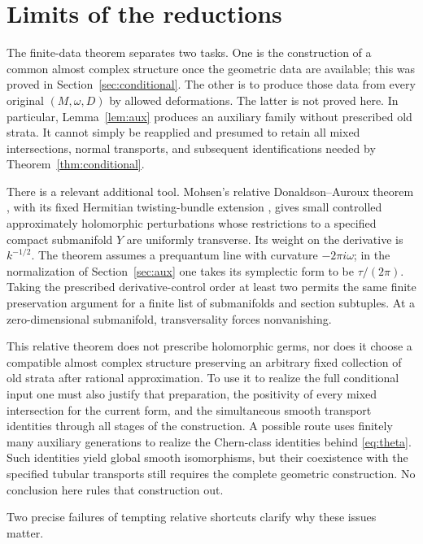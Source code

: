 \documentclass[11pt]{article}
\theoremstyle{definition}
\theoremstyle{remark}
\begin{document}
\section{Limits of the reductions}\label{sec:limits}

The finite-data theorem separates two tasks. One is the construction of a common almost complex structure once the geometric data are available; this was proved in Section~\ref{sec:conditional}. The other is to produce those data from every original $(M,\omega,D)$ by allowed deformations. The latter is not proved here. In particular, Lemma~\ref{lem:aux} produces an auxiliary family without prescribed old strata. It cannot simply be reapplied and presumed to retain all mixed intersections, normal transports, and subsequent identifications needed by Theorem~\ref{thm:conditional}.

There is a relevant additional tool. Mohsen's relative Donaldson--Auroux theorem \cite[p.~657]{Mohsen}, with its fixed Hermitian twisting-bundle extension \cite[p.~662]{Mohsen}, gives small controlled approximately holomorphic perturbations whose restrictions to a specified compact submanifold $Y$ are uniformly transverse. Its weight on the derivative is $k^{-1/2}$. The theorem assumes a prequantum line with curvature $-2\pi i\omega$; in the normalization of Section~\ref{sec:aux} one takes its symplectic form to be $\tau/(2\pi)$. Taking the prescribed derivative-control order at least two permits the same finite preservation argument for a finite list of submanifolds and section subtuples. At a zero-dimensional submanifold, transversality forces nonvanishing.

This relative theorem does not prescribe holomorphic germs, nor does it choose a compatible almost complex structure preserving an arbitrary fixed collection of old strata after rational approximation. To use it to realize the full conditional input one must also justify that preparation, the positivity of every mixed intersection for the current form, and the simultaneous smooth transport identities through all stages of the construction. A possible route uses finitely many auxiliary generations to realize the Chern-class identities behind \eqref{eq:theta}. Such identities yield global smooth isomorphisms, but their coexistence with the specified tubular transports still requires the complete geometric construction. No conclusion here rules that construction out.

Two precise failures of tempting relative shortcuts clarify why these issues matter.
\end{document}
